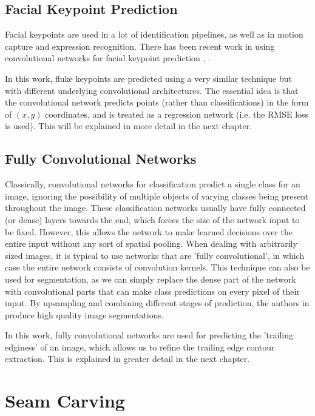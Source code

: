 \subsection{Facial Keypoint Prediction}

Facial keypoints are used in a lot of identification pipelines, as well as in motion capture and expression recognition.
There has been recent work in using convolutional networks for facial keypoint prediction \cite{sun2013deep}, \cite{nouri2014using}. 

In this work, fluke keypoints are predicted using a very similar technique but with different underlying convolutional architectures.
The essential idea is that the convolutional network predicts points (rather than classifications) in the form of $(x, y)$ coordinates, and is treated as a regression network (i.e. the RMSE loss is used). 
This will be explained in more detail in the next chapter.


\subsection{Fully Convolutional Networks}

Classically, convolutional networks for classification predict a single class for an image, ignoring the possibility of multiple objects of varying classes being present throughout the image.
These classification networks usually have fully connected (or dense) layers towards the end, which forces the size of the network input to be fixed.
However, this allows the network to make learned decisions over the entire input without any sort of spatial pooling.
When dealing with arbitrarily sized images, it is typical to use networks that are 'fully convolutional', in which case the entire network consists of convolution kernels. 
This technique can also be used for segmentation, as we can simply replace the dense part of the network with convolutional parts that can make class predictions on every pixel of their input.
By upsampling and combining different stages of prediction, the authors in \cite{long2015fully} produce high quality image segmentations.

In this work, fully convolutional networks are used for predicting the 'trailing edginess' of an image, which allows us to refine the trailing edge contour extraction. This is explained in greater detail in the next chapter.

\section{Seam Carving}

